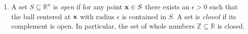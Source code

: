 \begin{enumerate}
    \item A set $S \subseteq \mathbb{R}^n$ is \textit{open} if for any point $\bold x \in S$ there exists an $\epsilon > 0$ such that the ball centered at $\bold x$ with radius $\epsilon$ is contained in $S$. A set is \textit{closed} if its complement is open. 
    In particular, the set of whole numbers $\mathbb{Z} \subseteq \mathbb{R}$ is closed.
\end{enumerate}